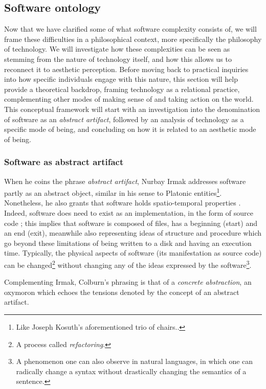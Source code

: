\subsection{Software ontology}
\label{subsec:software-ontology}

Now that we have clarified some of what software complexity consists of, we will frame these difficulties in a philosophical context, more specifically the philosophy of technology. We will investigate how these complexities can be seen as stemming from the nature of technology itself, and how this allows us to reconnect it to aesthetic perception. Before moving back to practical inquiries into how specific individuals engage with this nature, this section will help provide a theoretical backdrop, framing technology as a relational practice, complementing other modes of making sense of and taking action on the world. This conceptual framework will start with an investigation into the denomination of software as an \emph{abstract artifact}, followed by an analysis of technology as a specific mode of being, and concluding on how it is related to an aesthetic mode of being.

\subsubsection{Software as abstract artifact}
\label{subsubsec:abstract-artifact}

When he coins the phrase \emph{abstract artifact}, Nurbay Irmak addresses software partly as an abstract object, similar in his sense to Platonic entities\footnote{Like Joseph Kosuth's aforementioned trio of chairs..}. Nonetheless, he also grants that software holds spatio-temporal properties \citep{irmak_software_2012}. Indeed, software does need to exist as an implementation, in the form of source code \citep{suber_what_1988}; this implies that software is composed of files, has a beginning (start) and an end (exit), meanwhile also representing ideas of structure and procedure which go beyond these limitations of being written to a disk and having an execution time. Typically, the physical aspects of software (its manifestation as source code) can be changed\footnote{A process called \emph{refactoring}.} without changing any of the ideas expressed by the software\footnote{A phenomenon one can also observe in natural languages, in which one can radically change a syntax without drastically changing the semantics of a sentence.}.

Complementing Irmak, Colburn's phrasing is that of a \emph{concrete abstraction}, an oxymoron which echoes the tensions denoted by the concept of an abstract artifact.

